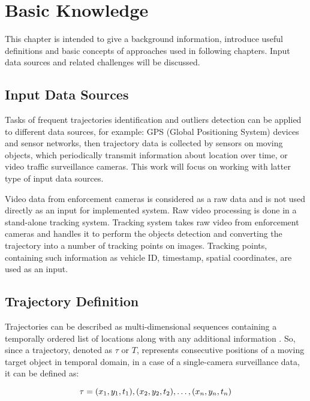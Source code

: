 \chapter{Basic Knowledge}
\label{ch:Basic Knowledge}

This chapter is intended to give a background information, introduce useful definitions and basic concepts of approaches used in following chapters. Input data sources and related challenges will be discussed.

\section{Input Data Sources}

Tasks of frequent trajectories identification and outliers detection can be applied to different data sources, for example: GPS (Global Positioning System) devices and sensor networks, then trajectory data is collected by sensors on moving objects, which periodically transmit information about location over time, or video traffic surveillance cameras. This work will focus on working with latter type of input data sources.

Video data from enforcement cameras is considered as a raw data and is not used directly as an input for implemented system. Raw video processing is done in a stand-alone tracking system. Tracking system takes raw video from enforcement cameras and handles it to perform the objects detection and converting the trajectory into a number of tracking points on images. Tracking points, containing such information as vehicle ID, timestamp, spatial coordinates, are used as an input.

\section{Trajectory Definition}

Trajectories can be described as multi-dimensional sequences containing a temporally ordered list of locations along with any additional information \cite{article:1_survey_stdm}. So, since a trajectory, denoted as $\tau$ or $T$, represents consecutive positions of a moving target object in temporal domain, in a case of a single-camera surveillance data, it can be defined as:

\begin{equation}
	\tau = {(x_1, y_1, t_1), (x_2, y_2, t_2), \ldots, (x_n, y_n, t_n)}\\[3pt]
\end{equation}

